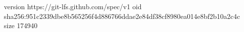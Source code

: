 version https://git-lfs.github.com/spec/v1
oid sha256:951c2339dbe8b565256f4d886766ddae2e84df38cf8980ea014e8bf2b10a2c4c
size 174940
